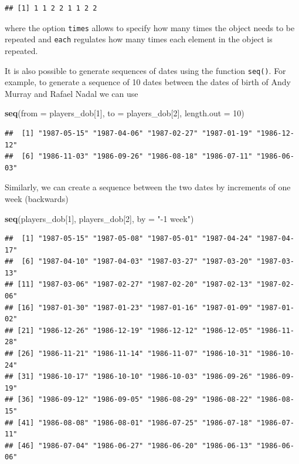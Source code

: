 \documentclass[12pt,]{krantz}
\newenvironment{Shaded}{\begin{snugshade}}{\end{snugshade}}
\newcommand{\KeywordTok}[1]{\textcolor[rgb]{0.27,0.27,0.27}{\textbf{#1}}}
\newcommand{\DataTypeTok}[1]{\textcolor[rgb]{0.27,0.27,0.27}{#1}}
\newcommand{\DecValTok}[1]{\textcolor[rgb]{0.06,0.06,0.06}{#1}}
\newcommand{\StringTok}[1]{\textcolor[rgb]{0.5,0.5,0.5}{#1}}
\newcommand{\NormalTok}[1]{#1}
\begin{document}
\begin{verbatim}
## [1] 1 1 2 2 1 1 2 2
\end{verbatim}

where the option \texttt{times} allows to specify how many times the
object needs to be repeated and \texttt{each} regulates how many times
each element in the object is repeated.

It is also possible to generate sequences of dates using the function
\texttt{seq()}. For example, to generate a sequence of 10 dates between
the dates of birth of Andy Murray and Rafael Nadal we can use

\begin{Shaded}
\begin{Highlighting}[]
\KeywordTok{seq}\NormalTok{(}\DataTypeTok{from =}\NormalTok{ players_dob[}\DecValTok{1}\NormalTok{], }\DataTypeTok{to =}\NormalTok{ players_dob[}\DecValTok{2}\NormalTok{], }\DataTypeTok{length.out =} \DecValTok{10}\NormalTok{)}
\end{Highlighting}
\end{Shaded}

\begin{verbatim}
##  [1] "1987-05-15" "1987-04-06" "1987-02-27" "1987-01-19" "1986-12-12"
##  [6] "1986-11-03" "1986-09-26" "1986-08-18" "1986-07-11" "1986-06-03"
\end{verbatim}

Similarly, we can create a sequence between the two dates by increments
of one week (backwards)

\begin{Shaded}
\begin{Highlighting}[]
\KeywordTok{seq}\NormalTok{(players_dob[}\DecValTok{1}\NormalTok{], players_dob[}\DecValTok{2}\NormalTok{], }\DataTypeTok{by =} \StringTok{"-1 week"}\NormalTok{)}
\end{Highlighting}
\end{Shaded}

\begin{verbatim}
##  [1] "1987-05-15" "1987-05-08" "1987-05-01" "1987-04-24" "1987-04-17"
##  [6] "1987-04-10" "1987-04-03" "1987-03-27" "1987-03-20" "1987-03-13"
## [11] "1987-03-06" "1987-02-27" "1987-02-20" "1987-02-13" "1987-02-06"
## [16] "1987-01-30" "1987-01-23" "1987-01-16" "1987-01-09" "1987-01-02"
## [21] "1986-12-26" "1986-12-19" "1986-12-12" "1986-12-05" "1986-11-28"
## [26] "1986-11-21" "1986-11-14" "1986-11-07" "1986-10-31" "1986-10-24"
## [31] "1986-10-17" "1986-10-10" "1986-10-03" "1986-09-26" "1986-09-19"
## [36] "1986-09-12" "1986-09-05" "1986-08-29" "1986-08-22" "1986-08-15"
## [41] "1986-08-08" "1986-08-01" "1986-07-25" "1986-07-18" "1986-07-11"
## [46] "1986-07-04" "1986-06-27" "1986-06-20" "1986-06-13" "1986-06-06"
\end{verbatim}
\end{document}
